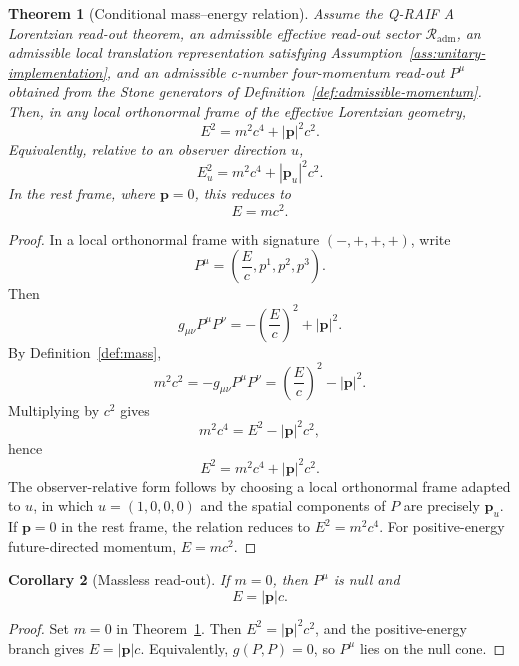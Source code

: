 \documentclass[12pt,a4paper]{article}
\newtheorem{theorem}{Theorem}[section]
\newtheorem{corollary}[theorem]{Corollary}
\theoremstyle{definition}
\theoremstyle{remark}
\newcommand{\Rout}{\mathcal{R}_{\mathrm{adm}}}
\begin{document}
\begin{theorem}[Conditional mass--energy relation]
\label{thm:mass-energy}
Assume the Q-RAIF A Lorentzian read-out theorem, an admissible effective read-out sector $\Rout$, an admissible local translation representation satisfying Assumption~\ref{ass:unitary-implementation}, and an admissible c-number four-momentum read-out $P^\mu$ obtained from the Stone generators of Definition~\ref{def:admissible-momentum}. Then, in any local orthonormal frame of the effective Lorentzian geometry,
\begin{equation}
E^2=m^2c^4+|\mathbf p|^2c^2 .
\end{equation}
Equivalently, relative to an observer direction $u$,
\begin{equation}
E_u^2=m^2c^4+|\mathbf p_u|^2c^2 .
\end{equation}
In the rest frame, where $\mathbf p=0$, this reduces to
\begin{equation}
E=mc^2 .
\end{equation}
\end{theorem}

\begin{proof}
In a local orthonormal frame with signature $(-,+,+,+)$, write
\[
P^\mu=\left(\frac{E}{c},p^1,p^2,p^3\right).
\]
Then
\[
g_{\mu\nu}P^\mu P^\nu
=-\left(\frac{E}{c}\right)^2+|\mathbf p|^2 .
\]
By Definition~\ref{def:mass},
\[
m^2c^2=-g_{\mu\nu}P^\mu P^\nu
=\left(\frac{E}{c}\right)^2-|\mathbf p|^2 .
\]
Multiplying by $c^2$ gives
\[
m^2c^4=E^2-|\mathbf p|^2c^2,
\]
hence
\[
E^2=m^2c^4+|\mathbf p|^2c^2 .
\]
The observer-relative form follows by choosing a local orthonormal frame adapted to $u$, in which $u=(1,0,0,0)$ and the spatial components of $P$ are precisely $\mathbf p_u$. If $\mathbf p=0$ in the rest frame, the relation reduces to $E^2=m^2c^4$. For positive-energy future-directed momentum, $E=mc^2$.
\end{proof}

\begin{corollary}[Massless read-out]
\label{cor:massless}
If $m=0$, then $P^\mu$ is null and
\begin{equation}
E=|\mathbf p|c .
\end{equation}
\end{corollary}

\begin{proof}
Set $m=0$ in Theorem~\ref{thm:mass-energy}. Then $E^2=|\mathbf p|^2c^2$, and the positive-energy branch gives $E=|\mathbf p|c$. Equivalently, $g(P,P)=0$, so $P^\mu$ lies on the null cone.
\end{proof}
\end{document}
